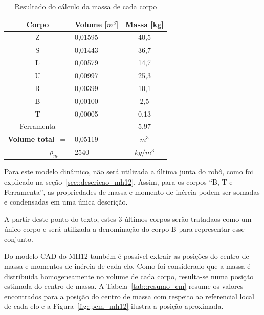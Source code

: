 \begin{table}[h]
\centering
\caption{Resultado do cálculo da massa de cada corpo}
\label{tab::massa_mh12}
\begin{tabular}{@{}clc@{}}
\toprule
\textbf{Corpo}                      & \textbf{Volume} [$m^3$] & \multicolumn{1}{l}{\textbf{Massa} [kg]} \\ \midrule 
Z 									& 0,01595         & 40,5							   \\
S                                   & 0,01443         & 36,7                               \\
L                                   & 0,00579         & 14,7                               \\
U                                   & 0,00997         & 25,3                               \\
R                                   & 0,00399         & 10,1                               \\
B                                   & 0,00100         & 2,5                                \\
T                                   & 0,00005         & 0,13                               \\
Ferramenta                          & -		          & 5,97							   \\ \midrule
\textbf{Volume total}~$=$           & 0,05119        & \multicolumn{1}{c}{$m^3$}	       \\
\multicolumn{1}{r}{\textbf{$\rho_m =$}} & 2540          &
\multicolumn{1}{c}{$kg/{m^3}$}     \\ \bottomrule
\end{tabular}
\end{table}
%

Para este modelo dinâmico, não será utilizada a última junta do robô, como foi
explicado na seção~\ref{sec::descricao_mh12}. Assim, para os corpos ``B, T e
Ferramenta'', as propriedades de massa e momento de inércia podem ser somadas e
condensadas em uma única descrição.

A partir deste ponto do texto, estes 3 últimos corpos serão tratadaos como um
único corpo e será utilizada a denominação do corpo B para representar esse conjunto.

Do modelo CAD do MH12 também é possível extrair as posições do centro de massa e
momentos de inércia de cada elo. Como foi considerado que a massa é distribuida
homogeneamente no volume de cada corpo, resulta-se numa posição estimada do
centro de massa. A Tabela~\ref{tab::resumo_cm} resume os valores encontrados
para a posição do centro de massa com respeito ao referencial local de cada elo
e a Figura~\ref{fig::pcm_mh12} ilustra a posição aproximada.

